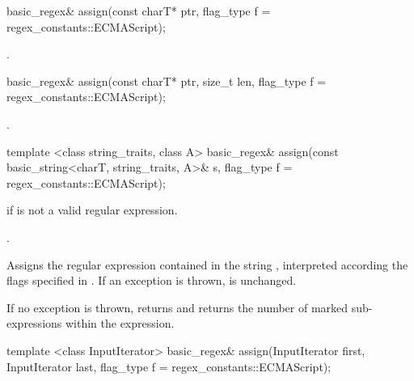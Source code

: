 %
%
\begin{itemdecl}
basic_regex& assign(const charT* ptr, flag_type f = regex_constants::ECMAScript); 
\end{itemdecl}

\begin{itemdescr}
\pnum
\returns  {}.
\end{itemdescr}

%
%
\begin{itemdecl}
basic_regex& assign(const charT* ptr, size_t len,
  flag_type f = regex_constants::ECMAScript);
\end{itemdecl}

\begin{itemdescr}
\pnum
\returns {}.
\end{itemdescr}

%
%
\begin{itemdecl}
template <class string_traits, class A>
  basic_regex& assign(const basic_string<charT, string_traits, A>& s,
                      flag_type f = regex_constants::ECMAScript); 
\end{itemdecl}

\begin{itemdescr}
\pnum
\throws  {} if  is not a valid regular expression. 

\pnum
\returns  {}.

\pnum
\effects  Assigns the regular expression contained in the string
, interpreted according the flags specified in . 
If an exception is thrown,  is unchanged.  

\pnum
\postconditions
If no exception is thrown,
 returns  and 
returns the number of marked sub-expressions within the expression.
\end{itemdescr}

%
%
\begin{itemdecl}
template <class InputIterator>
  basic_regex& assign(InputIterator first, InputIterator last,
                      flag_type f = regex_constants::ECMAScript);
\end{itemdecl}

